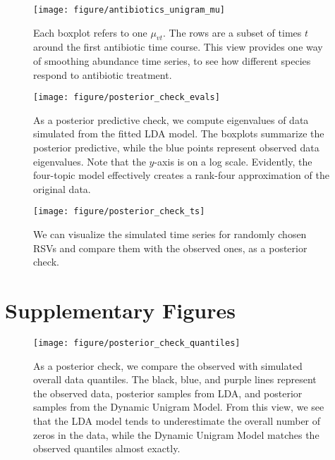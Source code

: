 \documentclass[oupdraft]{bio}
\begin{document}
\begin{figure}[!p]
  \centering
  \texttt{[image: figure/antibiotics\_unigram\_mu]}
  \caption{Each boxplot refers to one $\mu_{vt}$. The rows are a subset of times
    $t$ around the first antibiotic time course. This view provides one way of
    smoothing abundance time series, to see how different species respond to
    antibiotic treatment. \label{fig:antibiotics_unigram_theta} }
\end{figure}

\begin{figure}[!p]
  \centering
  \texttt{[image: figure/posterior\_check\_evals]}
  \caption{As a posterior predictive check, we compute eigenvalues of data
    simulated from the fitted LDA model. The boxplots summarize the posterior
    predictive, while the blue points represent observed data eigenvalues. Note
    that the $y$-axis is on a log scale. Evidently, the four-topic model
    effectively creates a rank-four approximation of the original
    data. \label{fig:antibiotics_posterior_evals}}
\end{figure}

\begin{figure}[!p]
  \centering
  \texttt{[image: figure/posterior\_check\_ts]}
  \caption{We can visualize the simulated time series for randomly chosen RSVs
    and compare them with the observed ones, as a posterior check.
    \label{fig:antibiotics_posterior_ts}}
\end{figure}


\section{Supplementary Figures}

\begin{figure}[!p]
  \centering
  \texttt{[image: figure/posterior\_check\_quantiles]}
  \caption{As a posterior check, we compare the observed with simulated overall
    data quantiles. The black, blue, and purple lines represent the observed
    data, posterior samples from LDA, and posterior samples from the Dynamic
    Unigram Model. From this view, we see that the LDA model tends to
    underestimate the overall number of zeros in the data, while the Dynamic
    Unigram Model matches the observed quantiles almost
    exactly. \label{fig:antibiotics_posterior_quantiles} }
\end{figure}
\end{document}
